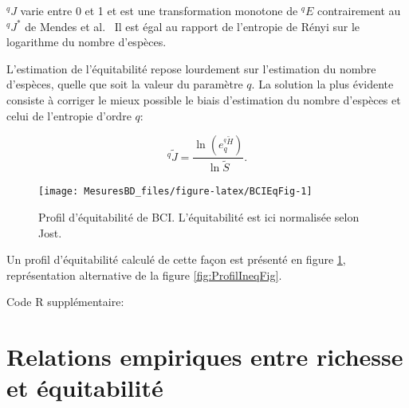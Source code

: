 \documentclass[
  11pt,
  french,
  a4paper,
  extrafontsizes,onecolumn,openright
  ]{memoir}
\newenvironment{Shaded}{\begin{snugshade}}{\end{snugshade}}
\newcommand{\DataTypeTok}[1]{\textcolor[rgb]{0.13,0.29,0.53}{#1}}
\newcommand{\KeywordTok}[1]{\textcolor[rgb]{0.13,0.29,0.53}{\textbf{#1}}}
\newcommand{\NormalTok}[1]{#1}
\newcommand{\OperatorTok}[1]{\textcolor[rgb]{0.81,0.36,0.00}{\textbf{#1}}}
\newcommand{\StringTok}[1]{\textcolor[rgb]{0.31,0.60,0.02}{#1}}
\newlength{\rf}
\begin{document}
\(^{q}\!J\) varie entre 0 et 1 et est une transformation monotone de \(^{q}\!E\) contrairement au \(^{q}\!J^{*}\) de Mendes et al.~
Il est égal au rapport de l'entropie de Rényi sur le logarithme du nombre d'espèces.

L'estimation de l'équitabilité repose lourdement sur l'estimation du nombre d'espèces, quelle que soit la valeur du paramètre \(q\).
La solution la plus évidente consiste à corriger le mieux possible le biais d'estimation du nombre d'espèces et celui de l'entropie d'ordre \(q\):

\begin{equation}
  \label{eq:EstJq}
  ^q\!{\tilde{J}}= \frac{\ln\left(e_q^{^q{\tilde{H}}} \right)}{\ln\tilde{S}}.
\end{equation}



\scriptsize

\begin{figure}

{\centering \texttt{[image: MesuresBD\_files/figure-latex/BCIEqFig-1]} 

}

\caption{Profil d'équitabilité de BCI. L'équitabilité est ici normalisée selon Jost.}\label{fig:BCIEqFig}
\end{figure}

\normalsize

Un profil d'équitabilité calculé de cette façon est présenté en figure \ref{fig:BCIEqFig}, représentation alternative de la figure \ref{fig:ProfilIneqFig}.

Code R supplémentaire:

\scriptsize

\begin{Shaded}
\end{Shaded}

\normalsize

\hypertarget{relations-empiriques-entre-richesse-et-uxe9quitabilituxe9}{%
\section{Relations empiriques entre richesse et équitabilité}\label{relations-empiriques-entre-richesse-et-uxe9quitabilituxe9}}
\end{document}

